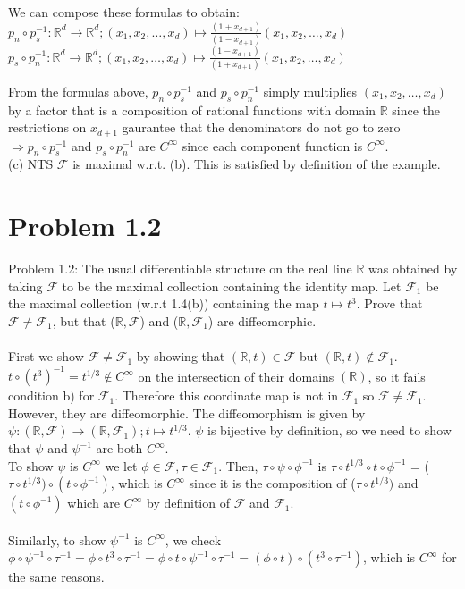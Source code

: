 \documentclass[paper=a4, fontsize=11pt]{scrartcl} %
\numberwithin{equation}{section} %
\numberwithin{figure}{section} %
\numberwithin{table}{section} %
\begin{document}
We can compose these formulas to obtain: \\
$p_n \circ p_s ^{-1}: \mathbb{R}^d \to \mathbb{R}^d; (x_1, x_2, \dots, x_d) \mapsto \frac{(1+x_{d+1})}{(1-x_{d+1})}(x_1, x_2, \dots, x_d) $ \\
$p_s \circ p_n ^{-1}: \mathbb{R}^d \to \mathbb{R}^d; (x_1, x_2, \dots, x_d) \mapsto \frac{(1-x_{d+1})}{(1+x_{d+1})}(x_1, x_2, \dots, x_d) $

From the formulas above, $p_n \circ p_s ^{-1}$ and $p_s \circ p_n ^{-1}$ simply multiplies $(x_1, x_2, \dots, x_d)$ by a factor that is a composition of rational functions with domain $\mathbb{R}$ since the restrictions on $x_{d+1}$ gaurantee that the denominators do not go to zero $\Rightarrow p_n \circ p_s ^{-1}$ and $p_s \circ p_n ^{-1}$ are $C^{\infty}$ since each component function is $C^{\infty}$. \\
(c) NTS $\mathscr{F}$ is maximal w.r.t. (b). This is satisfied by definition of the example.

\section*{Problem 1.2}
Problem 1.2: The usual differentiable structure on the real line $\mathbb{R}$ was obtained by taking $\mathscr{F}$ to be the maximal collection containing the identity map. Let $\mathscr{F}_1$ be the maximal collection (w.r.t 1.4(b)) containing the map $t \mapsto t^3$. Prove that $\mathscr{F} \neq \mathscr{F}_1$, but that ($\mathbb{R},\mathscr{F}$) and ($\mathbb{R},\mathscr{F}_1$) are diffeomorphic.
\\
\\
First we show $\mathscr{F} \neq \mathscr{F}_1$ by showing that $(\mathbb{R}, t) \in \mathscr{F}$ but $(\mathbb{R}, t) \not \in \mathscr{F}_1$. $t \circ (t^3)^{-1} = t^{1/3} \not \in C^{\infty}$ on the intersection of their domains $(\mathbb{R})$, so it fails condition b) for $\mathscr{F_{1}}$. Therefore this coordinate map is not in $\mathscr{F}_1$ so $\mathscr{F} \neq \mathscr{F}_1$. \\

However, they are diffeomorphic. The diffeomorphism is given by $\psi: (\mathbb{R}, \mathscr{F}) \to (\mathbb{R}, \mathscr{F}_1); t \mapsto t^{1/3}$. $\psi$ is bijective by definition, so we need to show that $\psi$ and $\psi ^{-1}$ are both $C^{\infty}$. \\

To show $\psi$ is $C^{\infty}$ we let $\phi \in \mathscr{F}, \tau \in \mathscr{F}_1$. Then, $\tau \circ \psi \circ \phi^{-1}$ is $\tau \circ t^{1/3} \circ t \circ \phi^{-1} $ = ($\tau \circ t^{1/3}) \circ (t \circ \phi^{-1})$, which is $C^{\infty}$ since it is the composition of ($\tau \circ t^{1/3})$ and $(t \circ \phi^{-1})$ which are $C^{\infty}$ by definition of $\mathscr{F}$ and $\mathscr{F}_1$.\\
\\
Similarly, to show $\psi^{-1}$ is $C^{\infty}$, we check $\phi \circ \psi^{-1} \circ \tau^{-1} = \phi \circ t^3 \circ \tau^{-1} = \phi \circ t \circ \psi^{-1} \circ \tau^{-1} = (\phi \circ t) \circ (t^3 \circ \tau^{-1})$, which is $C^{\infty}$ for the same reasons.
\end{document}
